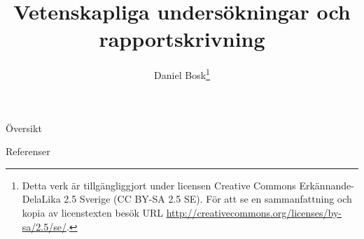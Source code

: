 \documentclass{beamer}
\title{%
  Vetenskapliga undersökningar och rapportskrivning
}
\author{Daniel Bosk\footnote{%
	\tiny
	Detta verk är tillgängliggjort under licensen Creative Commons 
	Erkännande-DelaLika 2.5 Sverige (CC BY-SA 2.5 SE).
	För att se en sammanfattning och kopia av licenstexten besök URL 
	\url{http://creativecommons.org/licenses/by-sa/2.5/se/}.
}}
\institute[MIUN ITM]{%
	Institutionen för informationsteknologi och medier (ITM),\\
	Mittuniversitetet, Sundsvall.
}
\date{\svnId}
\begin{document}
\begin{frame}
  \titlepage
\end{frame}

\begin{frame}{Översikt}
	\tableofcontents
\end{frame}







\begin{frame}{Referenser}
  
\end{frame}
\end{document}
